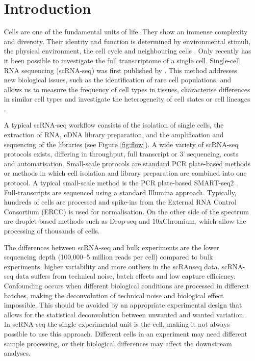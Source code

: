 \documentclass[12pt, a4paper]{article}\usepackage[]{graphicx}\usepackage[]{color}
\begin{document}

\bigskip
\newpage
\setcounter{page}{1}
\section{Introduction}
Cells are one of the fundamental units of life. They show an immense complexity and diversity. Their identity and function is determined by environmental stimuli, the physical environment, the cell cycle and neighbouring cells \citep{wagner2016revealing}. Only recently has it been possible to investigate the full transcriptome of a single cell. Single-cell RNA sequencing (scRNA-seq) was first published by \citet{tang2009mrna}. This method addresses new biological issues, such as the identification of rare cell populations, and allows us to measure the frequency of cell types in tissues, characterise differences in similar cell types and investigate the heterogeneity of cell states or cell lineages \citep{andrews2017identifying}.

A typical scRNA-seq workflow consists of the isolation of single cells, the extraction of RNA, cDNA library preparation, and the amplification and sequencing of the libraries (see Figure {\ref{fig:flow}}). A wide variety of scRNA-seq protocols exists, differing in throughput, full transcript or 3' sequencing, costs and automatisation. Small-scale protocols are standard PCR plate-based methods or methods in which cell isolation and library preparation are combined into one protocol. A typical small-scale method is the PCR plate-based SMART-seq2 \citep{picelli2013smart}. Full-transcripts are sequenced using a standard Illumina approach. Typically, hundreds of cells are processed and spike-ins from the External RNA Control Consortium (ERCC) is used for normalisation. On the other side of the spectrum are droplet-based methods such as Drop-seq and 10xChromium, which allow the processing of thousands of cells.

The differences between scRNA-seq and bulk experiments are the lower sequencing depth (100,000--5 million reads per cell) compared to bulk experiments, higher variability and more outliers in the scRAnseq data. scRNA-seq data suffers from technical noise, batch effects and low capture efficiency. Confounding occurs when different biological conditions are processed in different batches, making the deconvolution of technical noise and biological effect impossible. This should be avoided by an appropriate experimental design that allows for the statistical deconvolution between unwanted and wanted variation. In scRNA-seq the single experimental unit is the cell, making it not always possible to use this approach. Different cells in an experiment may need different sample processing, or their biological differences may affect the downstream analyses.
\end{document}
